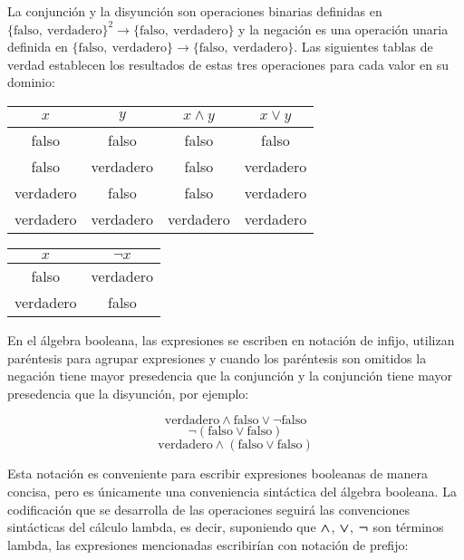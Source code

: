 La conjunción y la disyunción son operaciones binarias definidas en \( \{ \mathrm{falso},\ \mathrm{verdadero} \}^{2} \to \{ \mathrm{falso},\ \mathrm{verdadero} \}\) y la negación es una operación unaria definida en \( \{ \mathrm{falso},\ \mathrm{verdadero} \} \to \{ \mathrm{falso},\ \mathrm{verdadero} \} \). Las siguientes tablas de verdad establecen los resultados de estas tres operaciones para cada valor en su dominio:

\begin{table}[h!]
  \centering
  \small
  \begin{tabular}{|c|c|c|c|}
    \hline
    \( x \) & \( y \) & \( x \land y \) & \( x \lor y \) \\ [0.5ex]
    \hline\hline
    falso & falso & falso & falso \\
    falso & verdadero & falso & verdadero \\
    verdadero & falso & falso & verdadero \\
    verdadero & verdadero & verdadero & verdadero \\
    \hline
  \end{tabular}
  \hfill
  \begin{tabular}{|c|c|}
    \hline
    \( x \) & \( \lnot x \) \\ [0.5ex]
    \hline\hline
    falso & verdadero  \\
    verdadero & falso \\
    \hline
  \end{tabular}
\end{table}

En el álgebra booleana, las expresiones se escriben en notación de infijo, utilizan paréntesis para agrupar expresiones y cuando los paréntesis son omitidos la negación tiene mayor presedencia que la conjunción y la conjunción tiene mayor presedencia que la disyunción, por ejemplo:

\[ \mathrm{verdadero} \land \mathrm{falso} \lor \lnot \mathrm{falso} \]
\[ \lnot (\mathrm{falso} \lor \mathrm{falso}) \]
\[ \mathrm{verdadero} \land (\mathrm{falso} \lor \mathrm{falso}) \]

Esta notación es conveniente para escribir expresiones booleanas de manera concisa, pero es únicamente una conveniencia sintáctica del álgebra booleana. La codificación que se desarrolla de las operaciones seguirá las convenciones sintácticas del cálculo lambda, es decir, suponiendo que \( \boldsymbol{\land} \), \( \boldsymbol{\lor} \), \( \boldsymbol{\lnot} \) son términos lambda, las expresiones mencionadas escribirían con notación de prefijo:

